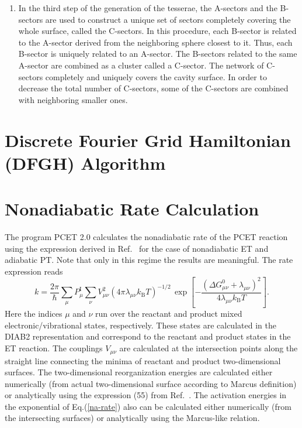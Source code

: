 \documentclass[oneside,11pt,openany]{book}
\newcommand{\tw}{\ttfamily}
\begin{document}
\begin{enumerate}
{The default is NTETFI1=NTETFI2=1, which leads to step sizes of 3$^o$.
This leads to 7200 B-sectors per sphere.}
\item{
In the third step of the generation of the tesserae, 
the A-sectors and the B-sectors are used to construct a unique
set of sectors completely covering the whole surface, called
the C-sectors.  In this procedure, each B-sector is
related to the A-sector derived from the neighboring sphere
closest to it.  Thus, each B-sector is uniquely related
to an A-sector.  The B-sectors related to
the same A-sector are combined as a cluster
called a C-sector.  The network of C-sectors
completely and uniquely covers the cavity surface.
In order to decrease the total number of C-sectors,
some of the C-sectors are combined with neighboring smaller ones.}
\end{enumerate}



\section{Discrete Fourier Grid Hamiltonian (DFGH) Algorithm}



\section{Nonadiabatic Rate Calculation}
The program PCET 2.0 calculates the nonadiabatic rate of the PCET
reaction using the expression derived in Ref.~\cite{pcet-jcp2}
for the case of nonadiabatic ET and adiabatic PT. Note that
only in this regime the results are meaningful. The rate expression
reads
\begin{equation}
k=\frac{2\pi}{\hbar}\sum_{\mu}P_{\mu}^{\mathrm I}
\sum_{\nu}V_{\mu\nu}^2
(4\pi\lambda_{\mu\nu}k_{\mathrm B}T)^{-1/2}\,
\exp\left[-\frac{(\Delta G_{\mu\nu}^0+\lambda_{\mu\nu})^2}
{4\lambda_{\mu\nu}k_{\mathrm B}T}\right].
\label{na-rate}
\end{equation}
Here the indices $\mu$ and $\nu$ run over the reactant and product
mixed electronic/vibrational states, respectively. These states
are calculated in the {\tw DIAB2} representation and
correspond to the reactant and product states in the ET reaction.
The couplings $V_{\mu\nu}$ are calculated at the intersection
points along the straight line connecting the minima of reactant
and product two-dimensional surfaces. The two-dimensional reorganization energies are calculated either numerically (from actual two-dimensional
surface according to Marcus definition) or analytically using
the expression (55) from Ref.~\cite{pcet-jcp2}. The activation
energies in the exponential of Eq.(\ref{na-rate}) also
can be calculated either numerically (from the intersecting
surfaces) or analytically using the Marcus-like relation.
\end{document}
